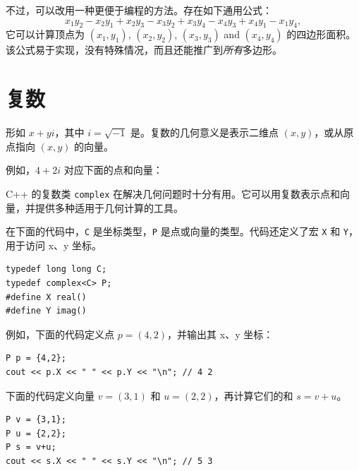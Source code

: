 不过，可以改用一种更便于编程的方法。存在如下通用公式：
\[x_1y_2-x_2y_1+x_2y_3-x_3y_2+x_3y_4-x_4y_3+x_4y_1-x_1y_4,\]
它可以计算顶点为
$(x_1,y_1)$,
$(x_2,y_2)$,
$(x_3,y_3)$ and
$(x_4,y_4)$ 的四边形面积。该公式易于实现，没有特殊情况，而且还能推广到\emph{所有}多边形。

\section{复数}


形如 $x+y i$，其中 $i = \sqrt{-1}$ 是。复数的几何意义是表示二维点 $(x,y)$，或从原点指向 $(x,y)$ 的向量。

例如，$4+2i$ 对应下面的点和向量：

\begin{center}
\end{center}


C++ 的复数类 \texttt{complex} 在解决几何问题时十分有用。它可以用复数表示点和向量，并提供多种适用于几何计算的工具。

在下面的代码中，\texttt{C} 是坐标类型，\texttt{P} 是点或向量的类型。代码还定义了宏 \texttt{X} 和 \texttt{Y}，用于访问 x、y 坐标。

\begin{lstlisting}
typedef long long C;
typedef complex<C> P;
#define X real()
#define Y imag()
\end{lstlisting}

例如，下面的代码定义点 $p=(4,2)$，并输出其 x、y 坐标：

\begin{lstlisting}
P p = {4,2};
cout << p.X << " " << p.Y << "\n"; // 4 2
\end{lstlisting}

下面的代码定义向量 $v=(3,1)$ 和 $u=(2,2)$，再计算它们的和 $s=v+u$。

\begin{lstlisting}
P v = {3,1};
P u = {2,2};
P s = v+u;
cout << s.X << " " << s.Y << "\n"; // 5 3
\end{lstlisting}

